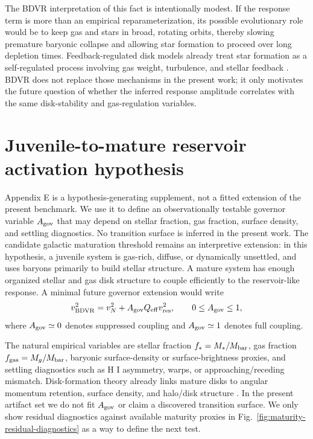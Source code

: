 \documentclass[aps,prd,preprint,nofootinbib,superscriptaddress]{revtex4-2}
\providecommand{\FloatBarrier}{\clearpage}
\begin{document}
The BDVR interpretation of this fact is intentionally modest. If the response term is more than an empirical reparameterization, its possible evolutionary role would be to keep gas and stars in broad, rotating orbits, thereby slowing premature baryonic collapse and allowing star formation to proceed over long depletion times. Feedback-regulated disk models already treat star formation as a self-regulated process involving gas weight, turbulence, and stellar feedback \cite{Ostriker2011}. BDVR does not replace those mechanisms in the present work; it only motivates the future question of whether the inferred response amplitude correlates with the same disk-stability and gas-regulation variables.

\clearpage
\FloatBarrier
\section{Juvenile-to-mature reservoir activation hypothesis}

Appendix E is a hypothesis-generating supplement, not a fitted extension of the present benchmark. We use it to define an observationally testable governor variable $A_{\rm gov}$ that may depend on stellar fraction, gas fraction, surface density, and settling diagnostics. No transition surface is inferred in the present work. The candidate galactic maturation threshold remains an interpretive extension: in this hypothesis, a juvenile system is gas-rich, diffuse, or dynamically unsettled, and uses baryons primarily to build stellar structure. A mature system has enough organized stellar and gas disk structure to couple efficiently to the reservoir-like response. A minimal future governor extension would write
\begin{equation}
v_{\rm BDVR}^2 = v_N^2 + A_{\rm gov} Q_{\rm eff} v_{\rm res}^2,
\qquad 0\le A_{\rm gov}\le 1,
\end{equation}
where $A_{\rm gov}\simeq0$ denotes suppressed coupling and $A_{\rm gov}\simeq1$ denotes full coupling.

The natural empirical variables are stellar fraction $f_*=M_*/M_{\rm bar}$, gas fraction $f_{\rm gas}=M_g/M_{\rm bar}$, baryonic surface-density or surface-brightness proxies, and settling diagnostics such as H I asymmetry, warps, or approaching/receding mismatch. Disk-formation theory already links mature disks to angular momentum retention, surface density, and halo/disk structure \cite{FallEfstathiou1980,MoMaoWhite1998,Dalcanton1997}. In the present artifact set we do not fit $A_{\rm gov}$ or claim a discovered transition surface. We only show residual diagnostics against available maturity proxies in Fig.~\ref{fig:maturity-residual-diagnostics} as a way to define the next test.
\end{document}
